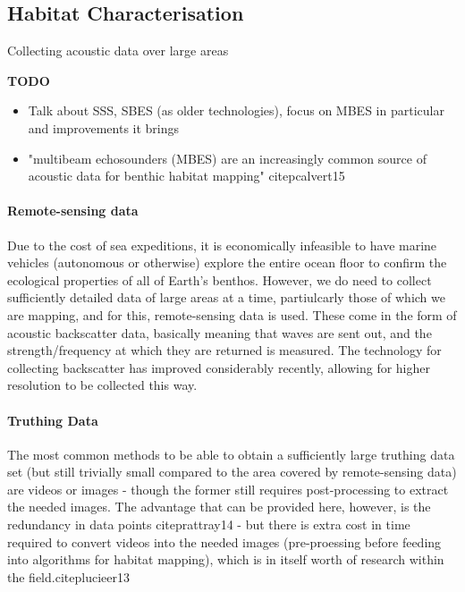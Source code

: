 \documentclass[12pt]{article}
\begin{document}
\begin{multicols}{2}
            \subsection{Habitat Characterisation}
            Collecting acoustic data over large areas 

            \textbf{TODO} 
            \begin{itemize}
                \item Talk about SSS, SBES (as older technologies), focus on MBES in particular and improvements it brings
                \item "multibeam echosounders (MBES) are an increasingly common source of acoustic data for benthic habitat mapping" citep{calvert15}
            \end{itemize}

            \paragraph{Remote-sensing data}
            Due to the cost of sea expeditions, it is economically infeasible to have marine vehicles (autonomous or otherwise) explore the entire ocean floor to confirm the ecological properties of all of Earth's benthos. However, we do need to collect sufficiently detailed data of large areas at a time, partiulcarly those of which we are mapping, and for this, remote-sensing data is used. These come in the form of acoustic backscatter data, basically meaning that waves are sent out, and the strength/frequency at which they are returned is measured. The technology for collecting backscatter has improved considerably recently, allowing for higher resolution to be collected this way.

            \paragraph{Truthing Data}
            The most common methods to be able to obtain a sufficiently large truthing data set (but still trivially small compared to the area covered by remote-sensing data) are videos or images - though the former still requires post-processing to extract the needed images. The advantage that can be provided here, however, is the redundancy in data points citep{rattray14}  - but there is extra cost in time required to convert videos into the needed images (pre-proessing before feeding into algorithms for habitat mapping), which is in itself worth of research within the field.citep{lucieer13}


\end{multicols}
\end{document}
